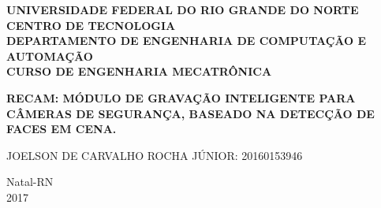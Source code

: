 \documentclass[a4paper,12pt]{article}
\begin{document}
\onehalfspacing

\thispagestyle{empty}

\setcounter{page}{1}


\begin{figure}[!ht]

\centering

\hspace{11.09cm}

\label{Logos}

\end{figure}


\vspace{-1cm}

\begin{center}
{\bf{\normalsize UNIVERSIDADE FEDERAL DO RIO GRANDE DO NORTE\\
CENTRO DE TECNOLOGIA\\
DEPARTAMENTO DE ENGENHARIA DE COMPUTAÇÃO E AUTOMAÇÃO\\
CURSO DE ENGENHARIA MECATRÔNICA
}}


\vspace{3.6cm}

{\bf{\large RECAM: MÓDULO DE GRAVAÇÃO INTELIGENTE PARA CÂMERAS DE SEGURANÇA, BASEADO NA DETECÇÃO DE FACES EM CENA.
}}
\vspace{0.4 cm}
{\large \\}

\vspace{5.6cm}



\begin{flushright}
\begin{normalsize}

JOELSON DE CARVALHO ROCHA JÚNIOR: 20160153946\\
\vspace{0.8cm}

\end{normalsize}
\end{flushright}


\vspace{6 cm}

{\large Natal-RN\\
2017}

\end{center}
\end{document}

